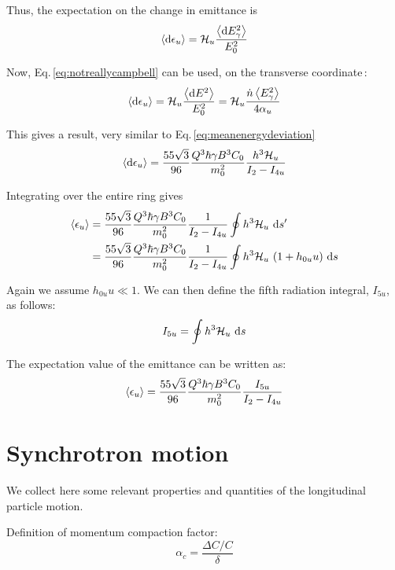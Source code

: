 Thus, the expectation on the change in emittance is
\begin{equation}
    \left\langle {\text{d}\epsilon_u} \right\rangle = \mathcal{H}_u \frac{\left\langle {\text{d}E_\gamma^2} \right\rangle}{E_0^2}
\end{equation}

Now, Eq.\,\ref{eq:notreallycampbell} can be used, on the transverse coordinate\,\cite{hofmann_2004}:
\begin{equation}
    \left\langle {\text{d}\epsilon_u} \right\rangle = \mathcal{H}_u \frac{\left\langle {\text{d}E^2} \right\rangle}{E_0^2} = \mathcal{H}_u \frac{\dot{n} \left\langle {E_\gamma^2} \right\rangle}{4 \alpha_u}
\end{equation}

This gives a result, very similar to Eq.\,\ref{eq:meanenergydeviation}
\begin{equation}
    \left\langle {\text{d}\epsilon_u} \right\rangle = \frac{55 \sqrt{3}}{96} \frac{Q^3 \hbar \gamma B^3 C_0}{m_0^2} \frac{h^3 \mathcal{H}_u}{I_2 - I_{4u}}
\end{equation}

Integrating over the entire ring gives
\begin{align}
    \left\langle {\epsilon_u} \right\rangle &= \frac{55 \sqrt{3}}{96} \frac{Q^3 \hbar \gamma B^3 C_0}{m_0^2}
    \frac{1}{I_2 - I_{4u}}\oint h^3 \mathcal{H}_u\ \text{d} s'\notag\\
    &= \frac{55 \sqrt{3}}{96} \frac{Q^3 \hbar \gamma B^3 C_0}{m_0^2}
    \frac{1}{I_2 - I_{4u}}\oint h^3 \mathcal{H}_u\ (1 + h_{0u}u)\ \text{d} s
\end{align}

Again we assume $h_{0u} u \ll 1$. We can then define the fifth radiation integral, $I_{5u}$, as follows:
\begin{equation}
    I_{5u} = \oint h^3 \curlyH_u\ \dee s
\end{equation}

The expectation value of the emittance can be written as:
\begin{equation}
    \left\langle {\epsilon_u} \right\rangle = \frac{55 \sqrt{3}}{96} \frac{Q^3 \hbar \gamma B^3 C_0}{m_0^2} \frac{I_{5u}}{I_2 - I_{4u}}
\end{equation}


\chapter{Synchrotron motion}
\label{ch:synchmon}

We collect here some relevant properties and quantities of the longitudinal particle motion.

Definition of momentum compaction factor:
\begin{equation}
\alpha_c = 
\frac{\Delta C/C}\delta
\end{equation}

